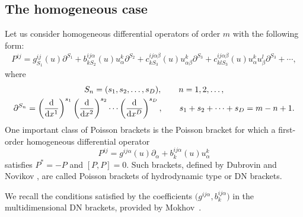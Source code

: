 \documentclass[10pt,a4paper]{amsart}
\numberwithin{equation}{section}
\begin{document}
\subsection{The homogeneous case}
Let us consider homogeneous differential operators of order $m$ with the following form:
\begin{gather*}
P^{ij}=g^{ij}_{S_1}(u)\partial^{S_1}+b^{ij\alpha}_{kS_2}(u) u^k_\alpha\partial^{S_2}+c^{ij\alpha\beta}_{kS_3}(u)u^k_{\alpha\beta}\partial^{S_3}+c^{ij\alpha\beta}_{klS_3}(u)u^k_\alpha u^l_\beta \partial^{S_3}+\cdots,
\end{gather*}
where
\begin{gather*}
S_n=(s_1,s_2,\dots,s_D) , \qquad n=1,2,\dots,
\\
\partial ^{S_n}=\left(\frac{\rm d}{{\rm d}x^1}\right)^{s_1}\left(\frac{\rm d}{{\rm d}x^2}\right)^{s_2}\cdots \left(\frac{\rm d}{{\rm d}x^D}\right)^{s_D} , \qquad s_1+s_2+\dots+s_D=m-n+1.
\end{gather*}
One important class of Poisson brackets is the Poisson bracket for which a first-order homogeneous differential operator
\begin{equation}\label{OP}
P^{ij}=g^{ij\alpha}(u)\partial_\alpha +b^{ij\alpha}_k(u)u^k_\alpha
 \end{equation}
satisfies $P^* =-P$ and $[P,P]=0$. Such brackets, defined by Dubrovin and Novikov \cite{dubrovin1996hamiltonian}, are called Poisson brackets of hydrodynamic type or DN brackets.

We recall the conditions satisfied by the coefficients $\big(g^{ij\alpha},b^{ij\alpha}_k\big)$ in the multidimensional DN brackets, provided by Mokhov~\cite{mokhov1988poisson}.
\end{document}
